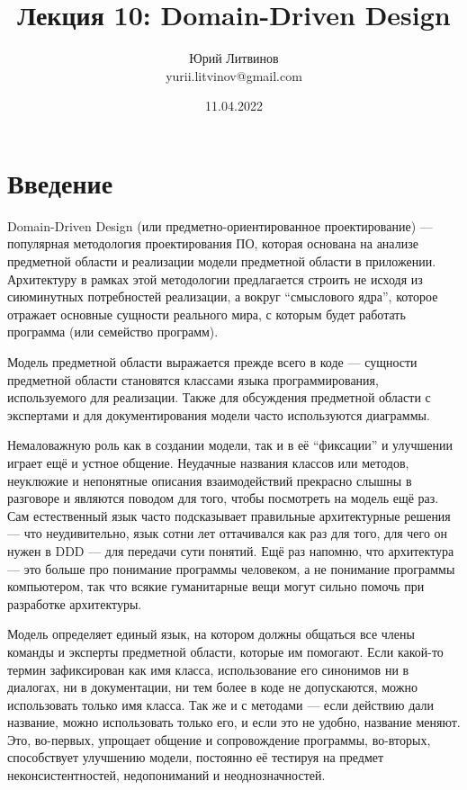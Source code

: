 \documentclass[a5paper]{article}
\title{Лекция 10: Domain-Driven Design}
\author{Юрий Литвинов\\\small{yurii.litvinov@gmail.com}}
\date{11.04.2022}
\begin{document}
\maketitle
\thispagestyle{empty}

\section{Введение}

Domain-Driven Design (или предметно-ориентированное проектирование) --- популярная методология проектирования ПО, которая основана на анализе предметной области и реализации модели предметной области в приложении. Архитектуру в рамках этой методологии предлагается строить не исходя из сиюминутных потребностей реализации, а вокруг ``смыслового ядра'', которое отражает основные сущности реального мира, с которым будет работать программа (или семейство программ).

Модель предметной области выражается прежде всего в коде --- сущности предметной области становятся классами языка программирования, используемого для реализации. Также для обсуждения предметной области с экспертами и для документирования модели часто используются диаграммы.

Немаловажную роль как в создании модели, так и в её ``фиксации'' и улучшении играет ещё и устное общение. Неудачные названия классов или методов, неуклюжие и непонятные описания взаимодействий прекрасно слышны в разговоре и являются поводом для того, чтобы посмотреть на модель ещё раз. Сам естественный язык часто подсказывает правильные архитектурные решения --- что неудивительно, язык сотни лет оттачивался как раз для того, для чего он нужен в DDD --- для передачи сути понятий. Ещё раз напомню, что архитектура --- это больше про понимание программы человеком, а не понимание программы компьютером, так что всякие гуманитарные вещи могут сильно помочь при разработке архитектуры.

Модель определяет единый язык, на котором должны общаться все члены команды и эксперты предметной области, которые им помогают. Если какой-то термин зафиксирован как имя класса, использование его синонимов ни в диалогах, ни в документации, ни тем более в коде не допускаются, можно использовать только имя класса. Так же и с методами --- если действию дали название, можно использовать только его, и если это не удобно, название меняют. Это, во-первых, упрощает общение и сопровождение программы, во-вторых, способствует улучшению модели, постоянно её тестируя на предмет неконсистентностей, недопониманий и неоднозначностей.
\end{document}
